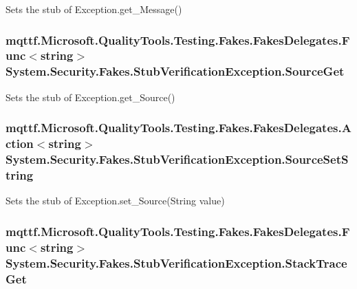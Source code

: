 Sets the stub of Exception.\-get\-\_\-\-Message()

\hypertarget{class_system_1_1_security_1_1_fakes_1_1_stub_verification_exception_a49896de5e147f9f4422ed983187674e2}{
\subsubsection[{Source\-Get}]{\setlength{\rightskip}{0pt plus 5cm}mqttf.\-Microsoft.\-Quality\-Tools.\-Testing.\-Fakes.\-Fakes\-Delegates.\-Func$<$string$>$ System.\-Security.\-Fakes.\-Stub\-Verification\-Exception.\-Source\-Get}}\label{class_system_1_1_security_1_1_fakes_1_1_stub_verification_exception_a49896de5e147f9f4422ed983187674e2}


Sets the stub of Exception.\-get\-\_\-\-Source()

\hypertarget{class_system_1_1_security_1_1_fakes_1_1_stub_verification_exception_a2ff723175ad049f52ebcdaed88f5f593}{
\subsubsection[{Source\-Set\-String}]{\setlength{\rightskip}{0pt plus 5cm}mqttf.\-Microsoft.\-Quality\-Tools.\-Testing.\-Fakes.\-Fakes\-Delegates.\-Action$<$string$>$ System.\-Security.\-Fakes.\-Stub\-Verification\-Exception.\-Source\-Set\-String}}\label{class_system_1_1_security_1_1_fakes_1_1_stub_verification_exception_a2ff723175ad049f52ebcdaed88f5f593}


Sets the stub of Exception.\-set\-\_\-\-Source(\-String value)

\hypertarget{class_system_1_1_security_1_1_fakes_1_1_stub_verification_exception_a54ff0a230a3c34fc75c9ef2f1fc2e30b}{
\subsubsection[{Stack\-Trace\-Get}]{\setlength{\rightskip}{0pt plus 5cm}mqttf.\-Microsoft.\-Quality\-Tools.\-Testing.\-Fakes.\-Fakes\-Delegates.\-Func$<$string$>$ System.\-Security.\-Fakes.\-Stub\-Verification\-Exception.\-Stack\-Trace\-Get}}\label{class_system_1_1_security_1_1_fakes_1_1_stub_verification_exception_a54ff0a230a3c34fc75c9ef2f1fc2e30b}


